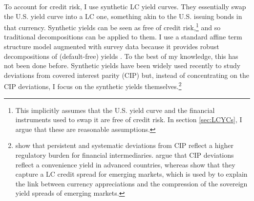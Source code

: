 {To account for credit risk, I use synthetic LC yield curves. They essentially swap the U.S. yield curve into a LC one, something akin to the U.S. issuing bonds in that currency. Synthetic yields can be seen as free of credit risk,\footnote{ This implicitly assumes that the U.S. yield curve and the financial instruments used to swap it are free of credit risk. In section \ref{sec:LCYCs}, I argue that these are reasonable assumptions.} and so traditional decompositions can be applied to them. I use a standard affine term structure model augmented with survey data because it provides robust decompositions of (default-free) yields \citep{Guimaraes:2014}. To the best of my knowledge, this has not been done before. Synthetic yields have been widely used recently to study deviations from covered interest parity (CIP) but, instead of concentrating on the CIP deviations, I focus on the synthetic yields themselves.\footnote{ \cite{DuTepperVerdelhan:2018} show that persistent and systematic deviations from CIP reflect a higher regulatory burden for financial intermediaries. \cite{DuImSchreger:2018JIE} argue that CIP deviations reflect a convenience yield in advanced countries, whereas \cite{DuSchreger:2016JoF} show that they capture a LC credit spread for emerging markets, which is used by \cite{HofmannShimShin:2019} to explain the link between currency appreciations and the compression of the sovereign yield spreads of emerging markets.}  

}
